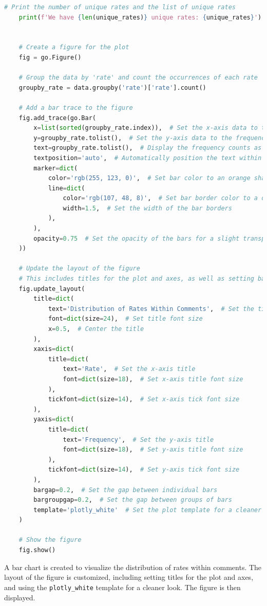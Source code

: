 \documentclass{solutionclass} %
\begin{document}
\begin{solution}
\begin{lstlisting}[language=Python, basicstyle=\ttfamily\footnotesize, keywordstyle=\color{blue}, commentstyle=\color{gray}]
    # Print the number of unique rates and the list of unique rates
    print(f'We have {len(unique_rates)} unique rates: {unique_rates}')
    
    
    # Create a figure for the plot
    fig = go.Figure()
    
    # Group the data by 'rate' and count the occurrences of each rate
    groupby_rate = data.groupby('rate')['rate'].count()
    
    # Add a bar trace to the figure
    fig.add_trace(go.Bar(
        x=list(sorted(groupby_rate.index)),  # Set the x-axis data to the sorted unique rates
        y=groupby_rate.tolist(),  # Set the y-axis data to the frequency counts of each rate
        text=groupby_rate.tolist(),  # Display the frequency counts as text on the bars
        textposition='auto',  # Automatically position the text within the bars
        marker=dict(
            color='rgb(255, 123, 0)',  # Set bar color to an orange shade
            line=dict(
                color='rgb(107, 48, 8)',  # Set bar border color to a darker orange/brown
                width=1.5,  # Set the width of the bar borders
            ),
        ),
        opacity=0.75  # Set the opacity of the bars for a slight transparency effect
    ))
    
    # Update the layout of the figure
    # This includes titles for the plot and axes, as well as setting bar gaps
    fig.update_layout(
        title=dict(
            text='Distribution of Rates Within Comments',  # Set the title of the plot
            font=dict(size=24),  # Set title font size
            x=0.5,  # Center the title
        ),
        xaxis=dict(
            title=dict(
                text='Rate',  # Set the x-axis title
                font=dict(size=18),  # Set x-axis title font size
            ),
            tickfont=dict(size=14),  # Set x-axis tick font size
        ),
        yaxis=dict(
            title=dict(
                text='Frequency',  # Set the y-axis title
                font=dict(size=18),  # Set y-axis title font size
            ),
            tickfont=dict(size=14),  # Set y-axis tick font size
        ),
        bargap=0.2,  # Set the gap between individual bars
        bargroupgap=0.2,  # Set the gap between groups of bars
        template='plotly_white'  # Set the plot template for a cleaner look
    )
    
    # Show the figure
    fig.show()
    \end{lstlisting}
    
    A bar chart is created to visualize the distribution of rates within comments. The layout of the figure is customized, including setting titles for the plot and axes, and using the \texttt{plotly\_white} template for a cleaner look. The figure is then displayed.
    

\end{solution}
\end{document}
